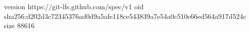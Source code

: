 version https://git-lfs.github.com/spec/v1
oid sha256:d202d3c72345376ad0d9a5afe118ce543839a7e54a0c510c66ed564a917d524c
size 88616
